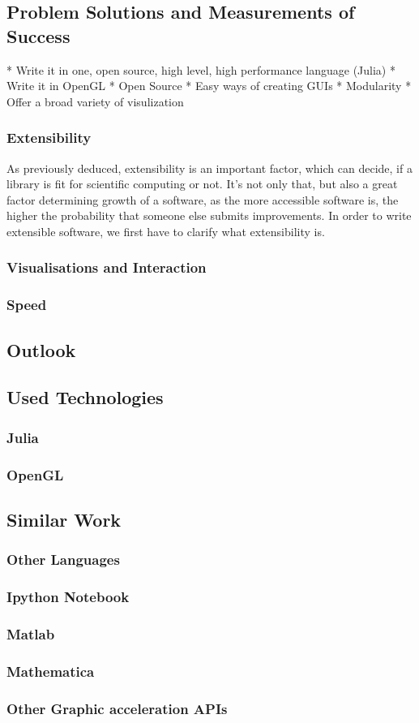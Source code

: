 \subsection{Problem Solutions and Measurements of Success}
* Write it in one, open source, high level, high performance language (Julia)
* Write it in OpenGL
* Open Source
* Easy ways of creating GUIs
* Modularity
* Offer a broad variety of visulization

\subsubsection{Extensibility}
As previously deduced, extensibility is an important factor, which can decide, if a library is fit for scientific computing or not. 
It's not only that, but also a great factor determining growth of a software, as the more accessible software is, the higher the probability that someone else submits improvements.
In order to write extensible software, we first have to clarify what extensibility is.

\subsubsection{Visualisations and Interaction}
\subsubsection{Speed}



\subsection{Outlook}

\subsection{Used Technologies}

\subsubsection{Julia}
\subsubsection{OpenGL}


\subsection{Similar Work}

\subsubsection{Other Languages}
\subsubsection{Ipython Notebook}
\subsubsection{Matlab}
\subsubsection{Mathematica}
\subsubsection{Other Graphic acceleration APIs}